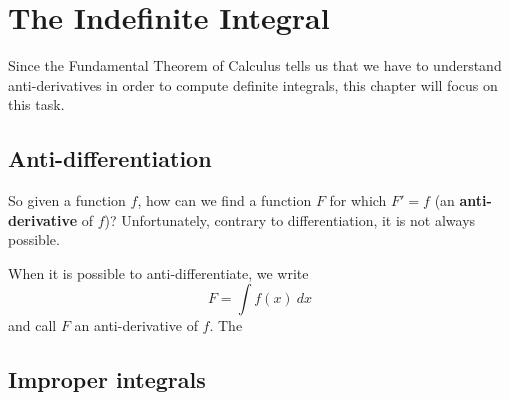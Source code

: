 \section{The Indefinite Integral}

Since the Fundamental Theorem of Calculus tells us that we have to understand anti-derivatives in order to compute definite integrals, this chapter will focus on this task.

\subsection{Anti-differentiation}

So given a function $f$, how can we find a function $F$ for which $F'=f$ (an \textbf{anti-derivative} of $f$)? Unfortunately, contrary to differentiation, it is not always possible. 

When it is possible to anti-differentiate, we write
$$F=\int f(x)\ dx$$
and call $F$ an anti-derivative of $f$. The


\subsection{Improper integrals}














